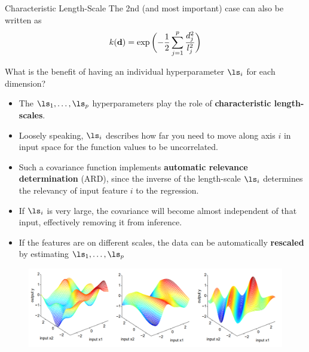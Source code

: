 \documentclass[11pt,compress,t,notes=noshow, xcolor=table]{beamer}
\begin{document}
\begin{frame}[c,allowframebreaks]{Characteristic Length-Scale}
The 2nd (and most important) case can also be written as 
$$
  k(\bold{d}) = \exp\,\biggl(- \frac{1}{2} \sum\limits_{j=1}^p \frac{d_j^2}{l_j^2} \biggr)
$$



\framebreak


What is the benefit of having an individual hyperparameter $\ls_i$ for each dimension?

\vspace{4mm}

\begin{itemize} 
\item The $\ls_1,\dots, \ls_p$ hyperparameters play the role of \textbf{characteristic length-scales}.
\vspace{2mm}
\item Loosely speaking, $\ls_i$ describes how far you need to move along axis $i$ in input space for the function values to be uncorrelated.
\vspace{2mm}
\item Such a covariance function implements \textbf{automatic relevance determination} (ARD), since the inverse of the length-scale $\ls_i$ determines the relevancy of input feature $i$ to the regression.
\vspace{2mm}
\item If $\ls_i$ is very large, the covariance will become almost independent of that input, effectively removing it from inference.
\vspace{2mm}
\item If the features are on different scales, the data can be automatically \textbf{rescaled} by estimating $\ls_1,\dots, \ls_p$ 

\end{itemize}



\framebreak


\begin{figure}
	\includegraphics[width = .8\textwidth]{figure_man/covariance2D.png}
\end{figure}


\end{frame}
\end{document}
